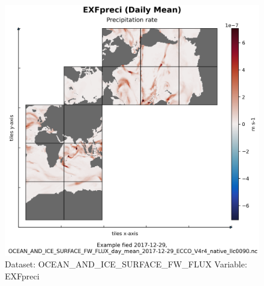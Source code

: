\begin{figure}[H]
\centering
\includegraphics[scale=0.55]{../images/plots/native_plots/Ocean_and_Sea-Ice_Surface_Freshwater_Fluxes/EXFpreci.png}
\caption{Dataset: OCEAN\_AND\_ICE\_SURFACE\_FW\_FLUX Variable: EXFpreci}
\label{tab:table-OCEAN_AND_ICE_SURFACE_FW_FLUX_EXFpreci-Plot}
\end{figure}
\pagebreak
